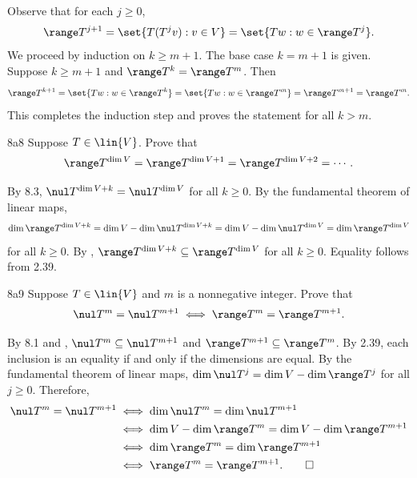 \begin{sol}
    Observe that for each $j \geq 0$,
    \[
        \range T^{j+1} = \set{T(T^j v) : v \in V} = \set{Tw : w \in \range T^j}.
    \]
    We proceed by induction on $k \geq m+1$.
    The base case $k = m+1$ is given.
    Suppose $k \geq m+1$ and $\range T^k = \range T^m$.
    Then
    \[
        \range T^{k+1} = \set{Tw : w \in \range T^k} = \set{Tw : w \in \range T^m} = \range T^{m+1} = \range T^m.
    \]
    This completes the induction step and proves the statement for all $k > m$.
\end{sol}

\begin{exercise}{8a8}
    Suppose $T \in \lin{V}$.
    Prove that
    \[
        \range T^{\dim V} = \range T^{\dim V + 1} = \range T^{\dim V + 2} = \cdots.
    \]
\end{exercise}

\begin{sol}
    By 8.3, $\nul T^{\dim V + k} = \nul T^{\dim V}$ for all $k \geq 0$.
    By the fundamental theorem of linear maps,
    \[
        \dim \range T^{\dim V + k} = \dim V - \dim \nul T^{\dim V + k} = \dim V - \dim \nul T^{\dim V} = \dim \range T^{\dim V}
    \]
    for all $k \geq 0$.
    By , $\range T^{\dim V + k} \subseteq \range T^{\dim V}$ for all $k \geq 0$.
    Equality follows from 2.39.
\end{sol}

\begin{exercise}{8a9}
    Suppose $T \in \lin{V}$ and $m$ is a nonnegative integer.
    Prove that
    \[
        \nul T^m = \nul T^{m+1} \iff \range T^m = \range T^{m+1}.
    \]
\end{exercise}

\begin{sol}
    By 8.1 and , $\nul T^m \subseteq \nul T^{m+1}$ and $\range T^{m+1} \subseteq \range T^m$.
    By 2.39, each inclusion is an equality if and only if the dimensions are equal.
    By the fundamental theorem of linear maps, $\dim \nul T^j = \dim V - \dim \range T^j$ for all $j \geq 0$.
    Therefore,
    \begin{align*}
        \nul T^m = \nul T^{m+1} &\iff \dim \nul T^m = \dim \nul T^{m+1} \\
        &\iff \dim V - \dim \range T^m = \dim V - \dim \range T^{m+1} \\
        &\iff \dim \range T^m = \dim \range T^{m+1} \\
        &\iff \range T^m = \range T^{m+1}. \qedhere
    \end{align*}
\end{sol}

